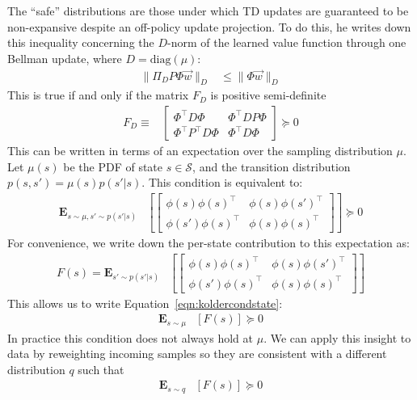 \documentclass[11pt]{article}
\newcommand{\E}{\textbf{E}}
\begin{document}
The ``safe'' distributions are those under which TD updates are guaranteed to be non-expansive despite an off-policy update projection. To do this, he writes down this inequality concerning the $D$-norm of the learned value function through one Bellman update, where $D=\text{diag}(\mu)$:
\begin{align}
    \|\Pi_D P\Phi \vec w\|_D & \leq \|\Phi \vec w\|_D
\end{align}
This is true if and only if the matrix $F_D$ is positive semi-definite
\begin{align}
    F_D \equiv & \begin{bmatrix}
        \Phi^\top D \Phi & \Phi^\top D P \Phi \\
        \Phi^\top P^\top D \Phi & \Phi^\top D \Phi
    \end{bmatrix} \succcurlyeq 0 \label{eqn:koltercondmat}
\end{align}
This can be written in terms of an expectation over the sampling distribution $\mu$. Let $\mu(s)$ be the PDF of state $s \in \mathcal S$, and the transition distribution $p(s,s') = \mu(s) p(s'|s)$. This condition is equivalent to:
\begin{align}
  \E_{s\sim \mu, s'\sim p(s'|s)} & \left[\begin{bmatrix}
        \phi(s)\phi(s)^\top & \phi(s)\phi(s')^\top \\
        \phi(s')\phi(s)^\top & \phi(s)\phi(s)^\top
    \end{bmatrix}\right] \succcurlyeq 0 \label{eqn:koldercondstate}
\end{align}
For convenience, we write down the per-state contribution to this expectation as:
\begin{align}
F(s) = \E_{s'\sim p(s'|s)} & \left[\begin{bmatrix}
    \phi(s)\phi(s)^\top & \phi(s)\phi(s')^\top \\
    \phi(s')\phi(s)^\top & \phi(s)\phi(s)^\top
\end{bmatrix}\right]
\end{align}
This allows us to write Equation~\ref{eqn:koldercondstate}:
\begin{align}
\E_{s\sim \mu} & [F(s)] \succcurlyeq 0
\end{align}
In practice this condition does not always hold at $\mu$. We can apply this insight to data by reweighting incoming samples so they are consistent with a different distribution $q$ such that
\begin{align}
\E_{s\sim q} & [F(s)] \succcurlyeq 0
\end{align}
\end{document}
